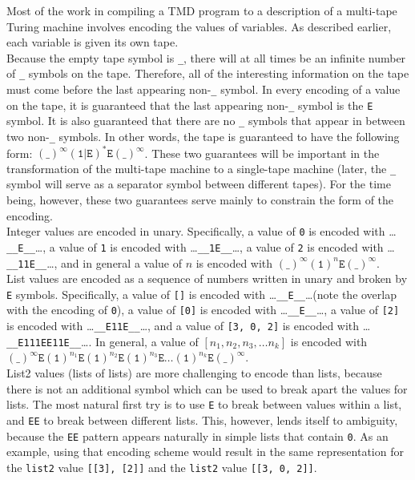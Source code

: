 \indent Most of the work in compiling a TMD program to a description of a multi-tape Turing machine involves encoding the values of variables. As described earlier, each variable is given its own tape. \\

Because the empty tape symbol is \texttt{\_}, there will at all times be an infinite number of \texttt{\_} symbols on the tape. Therefore, all of the interesting information on the tape must come before the last appearing non-\texttt{\_} symbol. In every encoding of a value on the tape, it is guaranteed that the last appearing non-\texttt{\_} symbol is the \texttt{E} symbol. It is also guaranteed that there are no \texttt{\_} symbols that appear in between two non-\texttt{\_} symbols. In other words, the tape is guaranteed to have the following form: $(\texttt{\_})^\infty(\texttt{1}|\texttt{E})^*\texttt{E}(\texttt{\_})^\infty$. These two guarantees will be important in the transformation of the multi-tape machine to a single-tape machine (later, the \texttt{\_} symbol will serve as a separator symbol between different tapes). For the time being, however, these two guarantees serve mainly to constrain the form of the encoding. \\

Integer values are encoded in unary. Specifically, a value of \texttt{0} is encoded with \dots\texttt{\_\_E\_\_}\dots, a value of \texttt{1} is encoded with \dots\texttt{\_\_1E\_\_}\dots, a value of \texttt{2} is encoded with \dots\texttt{\_\_11E\_\_}\dots, and in general a value of $n$ is encoded with $(\texttt{\_})^\infty(\texttt{1})^n\texttt{E}(\texttt{\_})^\infty$. \\

List values are encoded as a sequence of numbers written in unary and broken by \texttt{E} symbols. Specifically, a value of \texttt{[]} is encoded with \dots\texttt{\_\_E\_\_}\dots (note the overlap with the encoding of \texttt{0}), a value of \texttt{[0]} is encoded with \dots\texttt{\_\_E\_\_}\dots, a value of \texttt{[2]} is encoded with \dots\texttt{\_\_E11E\_\_}\dots, and a value of \texttt{[3, 0, 2]} is encoded with \dots\texttt{\_\_E111EE11E\_\_}\dots. In general, a value of $[n_1, n_2, n_3, \dots n_k]$ is encoded with $(\texttt{\_})^\infty\texttt{E}(\texttt{1})^{n_1}\texttt{E}(\texttt{1})^{n_2}\texttt{E}(\texttt{1})^{n_3}\texttt{E}\dots(\texttt{1})^{n_k}\texttt{E}(\texttt{\_})^\infty$. \\

List2 values (lists of lists) are more challenging to encode than lists, because there is not an additional symbol which can be used to break apart the values for lists. The most natural first try is to use \texttt{E} to break between values within a list, and \texttt{EE} to break between different lists. This, however, lends itself to ambiguity, because the \texttt{EE} pattern appears naturally in simple lists that contain \texttt{0}. As an example, using that encoding scheme would result in the same representation for the \texttt{list2} value \texttt{[[3], [2]]} and the \texttt{list2} value \texttt{[[3, 0, 2]]}. \\

